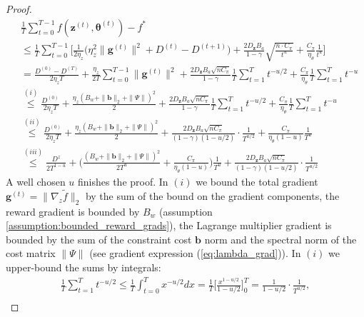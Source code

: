 \begin{proof}
\begin{align*}
    &\frac{1}{T} \sum_{t=0}^{T-1} f(\bm{z}^{(t)},\bm{\theta}^{(t)}) - f^* \\
    &\leq  \frac{1}{T} \sum_{t=0}^{T-1} \Bigg[ 
    \frac{1}{2\eta_z} \Big( 
         \eta_z^2\|\bm{g}^{(t)}\|^2
         + D^{(t)} - D^{(t+1)}
     \Big) 
     + \frac{2 D_{\bm{z}} B_a}{1 - \gamma}
     \sqrt{\frac{n \cdot C_\pi}{t^{u}}} 
     + \frac{C_\pi}{\eta_\theta} 
     \frac{1}{t^u}
    \Bigg] \\
    &=   \frac{D^{(0)} - D^{(T)}}{2\eta_z T} 
    +\frac{\eta_z}{2T} \sum_{t=0}^{T-1} 
         \|\bm{g}^{(t)}\|^2 
         + \frac{2 D_{\bm{z}} B_a\sqrt{n C_\pi}}{1 - \gamma}
        \frac{1}{T}\sum_{t=1}^{T} t^{-u/2}
         + \frac{C_\pi}{\eta_\theta}
        \frac{1}{T}\sum_{t=1}^{T} t^{-u}
        \\
    &\stackrel{(i)}{\leq}   \frac{D^{(0)}}{2\eta_z T} 
    +\frac{\eta_z (B_w + \|\bm{b}\|_2 + \|\Psi\|)^2}{2} 
        + \frac{2 D_{\bm{z}} B_a\sqrt{n C_\pi}}{1 - \gamma}
        \frac{1}{T}\sum_{t=1}^{T} t^{-u/2} 
        + \frac{C_\pi}{\eta_\theta}
        \frac{1}{T}\sum_{t=1}^{T} t^{-u}
        \\
    &\stackrel{(ii)}{\leq}  \frac{ D^{(0)} }{2\eta_z T}
    +\frac{\eta_z (B_w + \|\bm{b}\|_2 + \|\Psi\|)^2}{2} 
        + \frac{2 D_{\bm{z}} B_a\sqrt{n C_\pi}}{(1 - \gamma)(1-u/2)}\cdot \frac{1}{T^{u/2}}
        + \frac{C_\pi}{\eta_\theta(1-u)}
        \frac{1}{T^{u}}
        \\
    &\stackrel{(iii)}{\leq}  \frac{D^z}{2 T^{1-u}} 
    +\Bigg(\frac{(B_w + \|\bm{b}\|_2 + \|\Psi\|)^2}{2T^u} 
    + \frac{C_\pi}{\eta_\theta(1-u)}\Bigg)     \frac{1}{T^{u}}
    + \frac{2 D_{\bm{z}} B_a\sqrt{n C_\pi}}{(1 - \gamma)(1-u/2)}\cdot \frac{1}{T^{u/2}}
\end{align*}
A well chosen $u$ finishes the proof. In $(i)$ we bound the total gradient $\bm{g}^{(t)}=\|\nabla_z\tilde{f}\|_2$ by the sum of the bound on the gradient components, the reward gradient is bounded by $B_w$ (assumption \ref{assumption:bounded_reward_grads}), the Lagrange multiplier gradient is bounded by the sum of the constraint cost $\bm{b}$ norm and the spectral norm of the cost matrix $\|\Psi\|$ (see gradient expression (\ref{eq:lambda_grad})). In $(i)$ we upper-bound the sums by integrals:
\begin{align*}
    \frac{1}{T}\sum_{t=1}^{T} t^{-u/2} 
    \leq \frac{1}{T} \int_{t=0}^{T} x^{-u/2} dx 
    = \frac{1}{T} \Bigg[ \frac{x^{1-u/2}}{1-u/2}  \Bigg]^T_0 
    = \frac{1}{1-u/2}\cdot \frac{1}{T^{u/2}},\\

\end{align*}
\end{proof}
